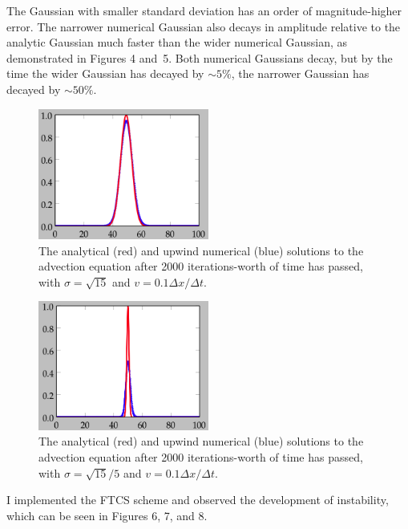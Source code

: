 \documentclass{article}
\begin{document}
\begin{spacing}{1.1}
The Gaussian with smaller standard deviation has an order of magnitude-higher error. The narrower numerical Gaussian also decays in amplitude relative to the analytic Gaussian much faster than the wider numerical Gaussian, as demonstrated in Figures 4 and~5. Both numerical Gaussians decay, but by the time the wider Gaussian has decayed by \(\sim 5\%\), the narrower Gaussian has decayed by \(\sim 50\%\).

\begin{figure}[H]
 \centering
 \hspace{0cm} \includegraphics[width=0.5\textwidth]{fig-sigma0.png}
 \caption{The analytical (red) and upwind numerical (blue) solutions to the advection equation after 2000 iterations-worth of time has passed, with \(\sigma = \sqrt{15}\) and \(v = 0.1 \Delta x / \Delta t\).}
 \label{fig-sigma0}
\end{figure} 

\begin{figure}[H]
 \centering
 \hspace{0cm} \includegraphics[width=0.5\textwidth]{fig-sigma0over5.png}
 \caption{The analytical (red) and upwind numerical (blue) solutions to the advection equation after 2000 iterations-worth of time has passed, with \(\sigma = \sqrt{15}/5\) and \(v = 0.1 \Delta x / \Delta t\).}
 \label{fig-sigma0over5}
\end{figure}

I implemented the FTCS scheme and observed the development of instability, which can be seen in Figures 6, 7, and 8.


\end{spacing}
\end{document}
